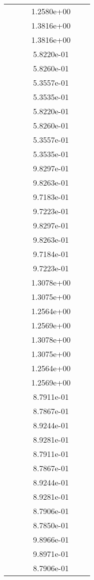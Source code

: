 \begin{xltabular}{\textwidth}{r|rS[table-format=1.3e+2]S[table-format=1.4e+2]S[table-format=1.4e+2]S[table-format=-1.5]}
&  &  & 1.2580e+00 & & \\
&  &  & 1.3816e+00 & & \\
&  &  & 1.3816e+00 & & \\
&  &  & 5.8220e-01 & & \\
&  &  & 5.8260e-01 & & \\
&  &  & 5.3557e-01 & & \\
&  &  & 5.3535e-01 & & \\
&  &  & 5.8220e-01 & & \\
&  &  & 5.8260e-01 & & \\
&  &  & 5.3557e-01 & & \\
&  &  & 5.3535e-01 & & \\
&  &  & 9.8297e-01 & & \\
&  &  & 9.8263e-01 & & \\
&  &  & 9.7183e-01 & & \\
&  &  & 9.7223e-01 & & \\
&  &  & 9.8297e-01 & & \\
&  &  & 9.8263e-01 & & \\
&  &  & 9.7184e-01 & & \\
&  &  & 9.7223e-01 & & \\
&  &  & 1.3078e+00 & & \\
&  &  & 1.3075e+00 & & \\
&  &  & 1.2564e+00 & & \\
&  &  & 1.2569e+00 & & \\
&  &  & 1.3078e+00 & & \\
&  &  & 1.3075e+00 & & \\
&  &  & 1.2564e+00 & & \\
&  &  & 1.2569e+00 & & \\
&  &  & 8.7911e-01 & & \\
&  &  & 8.7867e-01 & & \\
&  &  & 8.9244e-01 & & \\
&  &  & 8.9281e-01 & & \\
&  &  & 8.7911e-01 & & \\
&  &  & 8.7867e-01 & & \\
&  &  & 8.9244e-01 & & \\
&  &  & 8.9281e-01 & & \\
&  &  & 8.7906e-01 & & \\
&  &  & 8.7850e-01 & & \\
&  &  & 9.8966e-01 & & \\
&  &  & 9.8971e-01 & & \\
&  &  & 8.7906e-01 & & \\

\end{xltabular}
